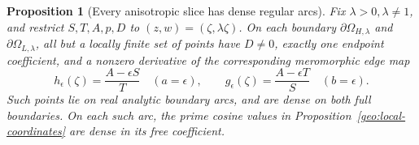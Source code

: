 \documentclass[11pt]{article}
\numberwithin{equation}{section}
\newtheorem{proposition}[theorem]{Proposition}
\theoremstyle{definition}
\begin{document}
\begin{proposition}[Every anisotropic slice has dense regular arcs]
\label{geo:slice-density}
Fix \(\lambda>0,\lambda\ne1\), and restrict \(S,T,A,p,D\)
to \((z,w)=(\zeta,\lambda\zeta)\).
On each boundary \(\partial\Omega_{H,\lambda}\) and
\(\partial\Omega_{L,\lambda}\), all but a locally finite
set of points have \(D\ne0\), exactly one endpoint
coefficient, and a nonzero derivative of the corresponding
meromorphic edge map
\begin{equation}\label{geo:slice-edge-maps}
 h_\epsilon(\zeta)=\frac{A-\epsilon S}{T}
       \quad(a=\epsilon),\qquad
 g_\epsilon(\zeta)=\frac{A-\epsilon T}{S}
       \quad(b=\epsilon).
\end{equation}
Such points lie on real analytic boundary arcs, and are
dense on both full boundaries.  On each such arc, the
prime cosine values in Proposition~\ref{geo:local-coordinates}
are dense in its free coefficient.
\end{proposition}
\end{document}
